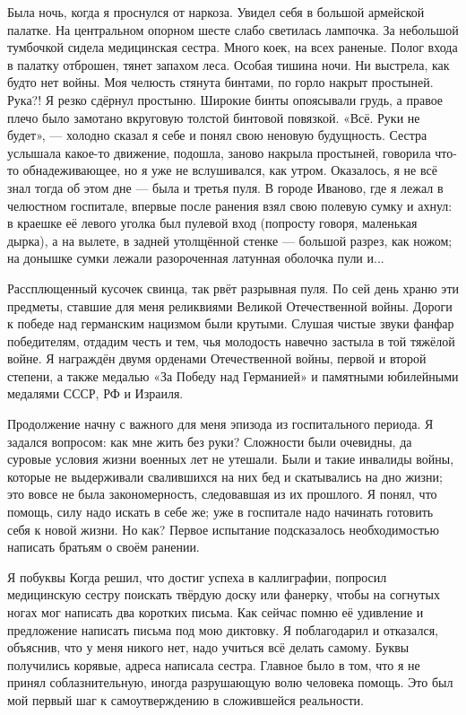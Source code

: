 \label{13-1}
Была ночь, когда я проснулся от наркоза. Увидел себя в большой армейской палатке. На центральном опорном шесте слабо светилась лампочка. За небольшой тумбочкой сидела медицинская сестра. Много коек, на всех раненые. Полог входа в палатку отброшен, тянет запахом леса. Особая тишина ночи. Ни выстрела, как будто нет войны. Моя челюсть стянута бинтами, по горло накрыт простыней. Рука?! Я резко сдёрнул простыню. Широкие бинты опоясывали грудь, а правое плечо было замотано вкруговую толстой бинтовой повязкой. «Всё. Руки не будет», — холодно сказал я себе и понял свою неновую будущность. Сестра услышала какое-то движение, подошла, заново накрыла простыней, говорила что-то обнадеживающее, но я уже не вслушивался, как утром. Оказалось, я не всё знал тогда об этом дне — была и третья пуля. В городе Иваново, где я лежал в челюстном госпитале, впервые после ранения взял свою полевую сумку и ахнул: в краешке её левого уголка был пулевой вход (попросту говоря, маленькая дырка), а на вылете, в задней утолщённой стенке — большой разрез, как ножом; на донышке сумки лежали разороченная латунная оболочка пули и...

\label{14-1}
Рассплющенный кусочек свинца, так рвёт разрывная пуля. По сей день храню эти предметы, ставшие для меня реликвиями Великой Отечественной войны. Дороги к победе над германским нацизмом были крутыми. Слушая чистые звуки фанфар победителям, отдадим честь и тем, чья молодость навечно застыла в той тяжёлой войне. Я награждён двумя орденами Отечественной войны, первой и второй степени, а также медалью «За Победу над Германией» и памятными юбилейными медалями СССР, РФ и \mbox{Израиля.\footnotemark}

\label{14-2}

\label{14-3}
Продолжение начну с важного для меня эпизода из госпитального периода. Я задался вопросом: как мне жить без руки? Сложности были очевидны, да суровые условия жизни военных лет не утешали. Были и такие инвалиды войны, которые не выдерживали свалившихся на них бед и скатывались на дно жизни; это вовсе не была закономерность, следовавшая из их прошлого. Я понял, что помощь, силу надо искать в себе же; уже в госпитале надо начинать готовить себя к новой жизни. Но как? Первое испытание подсказалось необходимостью написать братьям о своём ранении.

\label{15-1}
Я побуквы Когда решил, что достиг успеха в каллиграфии, попросил медицинскую сестру поискать твёрдую доску или фанерку, чтобы на согнутых ногах мог написать два коротких письма. Как сейчас помню её удивление и предложение написать письма под мою диктовку. Я поблагодарил и отказался, объяснив, что у меня никого нет, надо учиться всё делать самому. Буквы получились корявые, адреса написала сестра. Главное было в том, что я не принял соблазнительную, иногда разрушающую волю человека помощь. Это был мой первый шаг к самоутверждению в сложившейся реальности.
